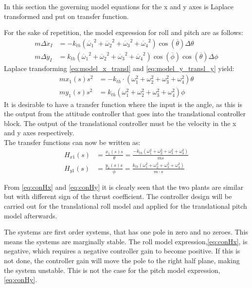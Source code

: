 In this section the governing model equations for the x and y axes is Laplace transformed and put on transfer function. 

For the sake of repetition, the model expression for roll and pitch are as follows:
\begin{align}
m\Delta\ddot{x}_I&= -k_{th}({\overline{\omega}_1}^2+{\overline{\omega}_2}^2+{\overline{\omega}_3}^2+{\overline{\omega}_4}^2)\cos(\overline{\theta})\Delta\theta\\ \label{eq:model_x_transl}
m\Delta\ddot{y}_I&= k_{th}({\overline{\omega}_1}^2+{\overline{\omega}_2}^2+{\overline{\omega}_3}^2+{\overline{\omega}_4}^2)\cos(\overline{\phi})\cos(\overline{\theta})\Delta\phi \label{eq:model_y_transl}
\end{align} 
Laplace transforming \autoref{eq:model_x_transl} and \ref{eq:model_y_transl_y} yield:
\begin{align}
m x_1(s)s^2&=-k_{th}\cdot (\omega_1 ^2 + \omega_2 ^2 + \omega_3 ^2 + \omega_4 ^2) \theta\\
m y_1(s) s^2&= k_{th} (\omega_1 ^2 + \omega_2 ^2 + \omega_3 ^2 + \omega_4 ^2)\phi
\end{align}
It is desirable to have a transfer function where the input is the angle, as this is the output from the attitude controller that goes into the translational controller block. The output of the translational controller must be the velocity in the x and y axes respectively. \\
The transfer functions can now be written as:
\begin{align}
H_{x1}(s)&=\frac{x_1(s) s}{\theta}=\frac{-k_{th} (\omega_1 ^2 + \omega_2 ^2 + \omega_3 ^2 + \omega_4 ^2)}{m s}\label{eq:conHx}\\
H_{y1}(s)&=\frac{y_1(s) s}{\phi}=\frac{k_{th}(\omega_1 ^2 + \omega_2 ^2 + \omega_3 ^2 + \omega_4 ^2)}{m\cdot s}\label{eq:conHy}
\end{align}
\begin{where}
\end{where}

From \autoref{eq:conHx} and \ref{eq:conHy} it is clearly seen that the two plants are similar but with different sign of the thrust coefficient. The controller design will be carried out for the translational roll model and applied for the translational pitch model  afterwards.

The systems are first order systems, that has one pole in zero and no zeroes. This means the systems are marginally stable. The roll model expression,\autoref{eq:conHx}, is negative, which requires a negative controller gain to become positive. If this is not done, the controller gain will move the pole to the right half plane, making the system unstable. This is not the case for the pitch model expression, \autoref{eq:conHy}.  

